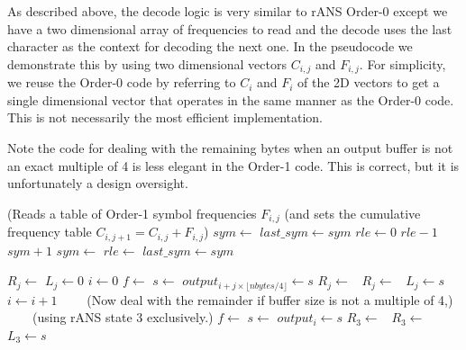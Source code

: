\documentclass[a4paper]{article}
\begin{document}
As described above, the decode logic is very similar to rANS Order-0 except we have a two dimensional array of frequencies to read and the decode uses the last character as the context for decoding the next one.
In the pseudocode we demonstrate this by using two dimensional vectors $C_{i,j}$ and $F_{i,j}$.
For simplicity, we reuse the Order-0 code by referring to $C_i$ and $F_i$ of the 2D vectors to get a single dimensional vector that operates in the same manner as the Order-0 code.
This is not necessarily the most efficient implementation.

Note the code for dealing with the remaining bytes when an output buffer is not an exact multiple of 4 is less elegant in the Order-1 code.
This is correct, but it is unfortunately a design oversight.

\vskip 0.5cm

\begin{algorithmic}[1]
\Statex (Reads a table of Order-1 symbol frequencies $F_{i,j}$
\Statex (and sets the cumulative frequency table $C_{i,j+1} = C_{i,j}+F_{i,j}$)
\State $sym \gets$ 
\State $last\_sym \gets sym$
\State $rle \gets 0$
\Repeat
  \State {}
    \settowidth{\maxwidth}{sym}
    \State {} $rle-1$
    \State {} $sym+1$
  \Else
    \State $sym \gets$ 
      \State $rle \gets$ 
    \EndIf
  \EndIf
  \State $last\_sym \gets sym$
\EndProcedure

\Statex
{}
  \State {}
    \State $R_j \gets$ 
    \State $L_j \gets 0$
  \EndFor
  \State $i \gets 0$
      \State $f \gets$ 
      \State $s \gets$ 
      \State $output_{i + j \times \lfloor nbytes/4 \rfloor} \gets s$
      \State $R_j \gets$\ 
      \State $R_j \gets$\ 
      \State $L_j \gets s$
    \EndFor
    \State $i \gets i+1$
  \EndWhile
  \Statex \ \ \ \ (Now deal with the remainder if buffer size is not a multiple of 4,)
  \Statex \ \ \ \ (using rANS state 3 exclusively.)
    \State $f \gets$ 
    \State $s \gets$ 
    \State $output_i \gets s$
    \State $R_3 \gets$\ 
    \State $R_3 \gets$\ 
    \State $L_3 \gets s$
  \EndFor
\EndProcedure
\end{algorithmic}
\end{document}
